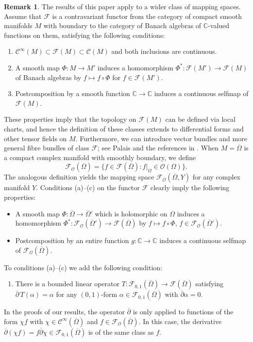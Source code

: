 \documentclass[11pt]{amsart}
\numberwithin{equation}{section}
\theoremstyle{definition}
\newtheorem{remark}[theorem]{Remark}
\newcommand\Fcal{\mathcal{F}}
\newcommand\Cscr{\mathscr{C}}
\newcommand\Oscr{\mathscr{O}}
\newcommand\C{\mathbb{C}}
\newcommand\dibar{\overline\partial}
\begin{document}
%
%
\begin{remark}\label{rem:Fcal}
The results of this paper apply to a wider class of mapping spaces.
Assume that $\Fcal$ is a contravariant functor from the category 
of compact smooth manifolds $M$ with boundary 
to the category of Banach algebras of $\C$-valued functions 
on them, satisfying the following conditions:
%
\begin{enumerate}[\rm (a)]
\item 
$\Cscr^\infty(M) \subset \Fcal(M)\subset \Cscr(M)$ and  
both inclusions are continuous. 
\item 
A smooth map $\Phi:M\to M'$ induces a homomorphism 
$\Phi^*:\Fcal(M') \to \Fcal (M)$ of Banach algebras by
$f\mapsto f\circ \Phi$ for $f\in \Fcal(M')$.
\item 
Postcomposition by a smooth function $\C\to\C$ induces
a continuous selfmap of $\Fcal(M)$.
\end{enumerate}
%
These properties imply that the topology on $\Fcal(M)$ 
can be defined via local charts, and hence the
definition of these classes extends to differential forms and other tensor 
fields on $M$. Furthermore, we can introduce vector bundles
and more general fibre bundles of class $\Fcal$; 
see Palais \cite{Palais1968,Palais1971} and the 
references in \cite{Forstneric2007AJM}.
%
When $M=\overline \Omega$ is a compact complex manifold with 
smoothly boundary, we define
\[
	\Fcal_\Oscr(\overline \Omega)=
	\{f\in \Fcal(\overline \Omega): f|_\Omega\in\Oscr(\Omega)\}.
\]
The analogous definition yields the mapping space
$\Fcal_\Oscr(\overline\Omega,Y)$ for any complex manifold $Y$.
Conditions (a)--(c) on the functor $\Fcal$ clearly 
imply the following properties:
%
\begin{itemize} 
\item 
A smooth map $\Phi:\overline\Omega \to \overline\Omega'$
which is holomorphic on $\Omega$ induces a homomorphism 
$\Phi^*:\Fcal_\Oscr(\overline\Omega') \to \Fcal (\overline\Omega)$ by
$f\mapsto f\circ \Phi$, $f\in \Fcal_\Oscr(\overline\Omega')$.
%
\item 
Postcomposition by an entire function $g:\C\to\C$ induces
a continuous selfmap of $\Fcal_\Oscr(\overline \Omega)$.
\end{itemize}
%
To conditions (a)--(c) we add the following condition:
%
\begin{enumerate}[\rm (d)]
\item There is a bounded linear operator
$T:\Fcal_{0,1}(\overline\Omega) \to \Fcal(\overline\Omega)$
satisfying $\dibar \, T(\alpha)=\alpha$ for any $(0,1)$-form
$\alpha\in \Fcal_{0,1}(\overline\Omega)$ with $\dibar\alpha=0$.
\end{enumerate}
%
In the proofs of our results, the operator $\dibar$ 
is only applied to functions
of the form $\chi f$ with $\chi\in \Cscr^\infty(\overline\Omega)$
and $f\in \Fcal_\Oscr(\overline\Omega)$. In this case, the derivative
$\dibar(\chi f)=f\dibar\chi \in \Fcal_{0,1}(\overline\Omega)$ 
is of the same class as $f$.


\end{remark}
\end{document}
